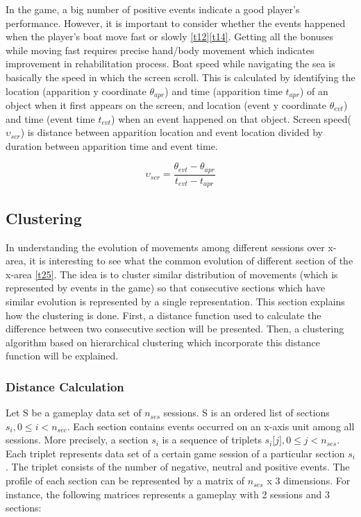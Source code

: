 \documentclass{vgtc}                          %
\begin{document}
In the game, a big number of positive events indicate a good player's performance. However, it is important to consider whether the events happened when the player's boat move fast or slowly \ref{t12}\ref{t14}. Getting all the bonuses while moving fast requires precise hand/body movement which indicates improvement in rehabilitation process. Boat speed while navigating the sea is basically the speed in which the screen scroll. This is calculated by identifying the location (apparition y coordinate $\theta_{apr}$) and time (apparition time $\textit{t}_{apr}$) of an object when it first appears on the screen, and location (event y coordinate $\theta_{evt}$) and time (event time $\textit{t}_{evt}$) when an event happened on that object. Screen speed($\upsilon_{scr}$) is distance between apparition location and event location divided by duration between apparition time and event time.

$$ \upsilon_{scr} = \frac{\theta_{evt}-\theta_{apr}}{\textit{t}_{evt}-\textit{t}_{apr}} $$

\subsection{Clustering}
In understanding the evolution of movements among different sessions over x-area, it is interesting to see what the common evolution of different section of the x-area \ref{t25}. The idea is to cluster similar distribution of movements (which is represented by events in the game) so that consecutive sections which have similar evolution is represented by a single representation. This section explains how the clustering is done. First, a distance function used to calculate the difference between two consecutive section will be presented. Then, a clustering algorithm based on hierarchical clustering which incorporate this distance function will be explained.

\subsubsection{Distance Calculation}
Let S be a gameplay data set of $n_{ses}$ sessions. S is an ordered list of sections $s_i, 0 \le i < n_{sec}$. Each section contains events occurred on an x-axis unit among all sessions. More precisely, a  section $s_i$ is a sequence of triplets $s_i\lbrack j \rbrack, 0 \le j < n_{ses}$. Each triplet represents data set of a certain game session of a particular section $s_i$. The triplet consists of the number of negative, neutral and positive events. The profile of each section can be represented by a matrix of $n_{ses}$ x 3 dimensions. For instance, the following matrices represents a gameplay with 2 sessions and 3 sections:
\end{document}

